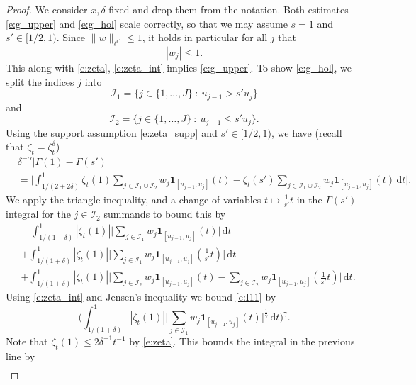 \documentclass[12pt,reqno,a4paper,dvipsnames]{amsart}
\theoremstyle{plain}
\theoremstyle{definition}
\numberwithin{theorem}{section}
\numberwithin{equation}{section}
\begin{document}
    \begin{proof}
    We consider $x, \delta$ fixed and drop them from the notation. Both estimates \eqref{e:g_upper} and \eqref{e:g_hol} scale correctly, so that we may assume $s = 1$ and $s' \in [1/2, 1)$. Since $\|w\|_{\ell^{r'}} \le 1$,
    it holds in particular for all $j$ that
    \[  
        |w_j| \le 1.
    \]
    This along with \eqref{e:zeta}, \eqref{e:zeta_int} implies \eqref{e:g_upper}. To show \eqref{e:g_hol}, we split the indices $j$ into
    \[
        \mathcal{I}_1 = \{j \in \{1, \dotsc, J\} \ : \ u_{j-1} > s' u_{j}\}
    \]
    and 
    \[
        \mathcal{I}_2 = \{j \in \{1, \dotsc, J\} \ : \ u_{j-1}  \le s' u_{j}\}.
    \]
    Using the support assumption \eqref{e:zeta_supp} and $s' \in [1/2,1)$, we have (recall that $\zeta_t = \zeta_t^\delta$)
    \begin{align*}
        &\delta^{-\alpha}|\Gamma(1) - \Gamma(s')|\\
        &= \Big| \int_{1/(2+2\delta)}^{1} \zeta_t(1) \sum_{j \in \mathcal{I}_1 \cup \mathcal{I}_2} w_j \mathbf{1}_{[u_{j-1}, u_j]}(t) - \zeta_t(s') \sum_{j \in \mathcal{I}_1 \cup \mathcal{I}_2} w_j \mathbf{1}_{[u_{j-1}, u_j]}(t)\, \mathrm{d}t \Big|.
    \end{align*}
    We apply the triangle inequality, and a change of variables $t \mapsto \frac{1}{s'}t $ in the $\Gamma(s')$ integral for the $j \in \mathcal{I}_2$ summands to bound this by
    \begin{align}
        &\quad \int_{1/(1+\delta)}^{1} |\zeta_t(1)| \Big|\sum_{j \in \mathcal{I}_1} w_j \mathbf{1}_{[u_{j-1}, u_j]}(t)\Big| \, \mathrm{d}t\label{e:I11}\\
        &+\int_{1/(1+\delta)}^{1} |\zeta_t(1)| \Big|\sum_{j \in \mathcal{I}_1} w_j \mathbf{1}_{[u_{j-1}, u_j]}(\frac{1}{s'}t)\Big| \, \mathrm{d}t\label{e:I12}\\
        &+ \int_{1/(1+\delta)}^{1} |\zeta_t(1)| \Big|\sum_{j \in \mathcal{I}_2} w_j \mathbf{1}_{[u_{j-1}, u_j]}(t) -  \sum_{j \in \mathcal{I}_2} w_j \mathbf{1}_{[u_{j-1}, u_j]}(\frac{1}{s'}t )\Big|\, \mathrm{d}t \label{e:I2}.
    \end{align}
    Using \eqref{e:zeta_int} and Jensen's inequality we bound \eqref{e:I11} by 
    \[
        \Big(\int_{1/(1+\delta)}^1 |\zeta_t(1)| \Big|\sum_{j \in \mathcal{I}_1} w_j \mathbf{1}_{[u_{j-1}, u_j]}(t)\Big|^{\frac{1}{\gamma}} \, \mathrm{d}t \Big)^\gamma.
    \]
    Note that $\zeta_t(1) \le 2 \delta^{-1} t^{-1}$ by \eqref{e:zeta}. This bounds the integral in the previous line by 
    \begin{align*}

\end{align*}
\end{proof}
\end{document}
